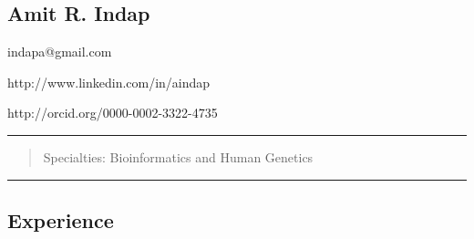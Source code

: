 \documentclass[]{article}
\author{}
\date{}
\begin{document}
\begin{center}
\section{Amit R. Indap}\label{amit-r.-indap}
indapa@gmail.com

 http://www.linkedin.com/in/aindap
 
 http://orcid.org/0000-0002-3322-4735
\end{center}

\begin{center}\rule{3in}{0.4pt}\end{center}

\begin{quote}
\begin{center}
Specialties: Bioinformatics and Human Genetics
\end{center}
\end{quote}

\begin{center}\rule{3in}{0.4pt}\end{center}

\subsection{Experience}\label{experience}
\end{document}
